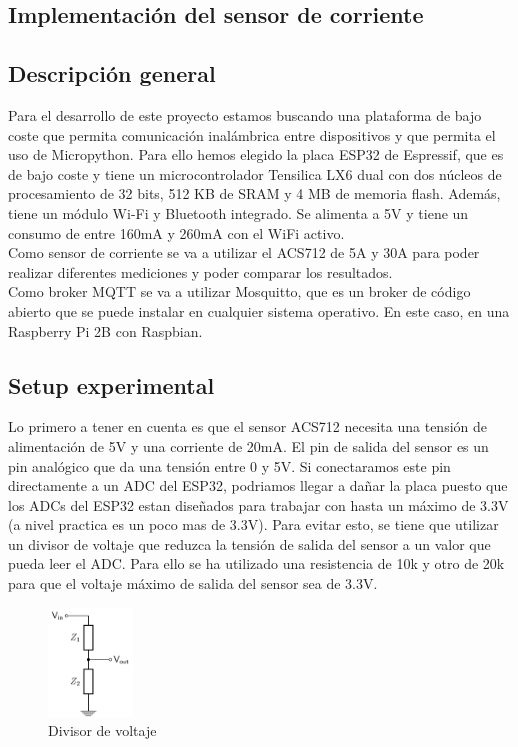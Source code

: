 \begin{titlepage}

\chapter{Implementación del sensor de corriente}
\section{Descripción general}
Para el desarrollo de este proyecto estamos buscando una plataforma de bajo coste que permita comunicación inalámbrica entre dispositivos y que permita el uso de Micropython. Para ello hemos elegido la placa ESP32 de Espressif, que es de bajo coste y tiene un microcontrolador Tensilica LX6 dual con dos núcleos de procesamiento de 32 bits, 512 KB de SRAM y 4 MB de memoria flash. Además, tiene un módulo Wi-Fi y Bluetooth integrado. Se alimenta a 5V y tiene un consumo\cite{ref16} de entre 160mA y 260mA con el WiFi activo. \\

Como sensor de corriente se va a utilizar el ACS712 de 5A y 30A para poder realizar diferentes mediciones y poder comparar los resultados. \\

Como broker MQTT se va a utilizar Mosquitto, que es un broker de código abierto que se puede instalar en cualquier sistema operativo. En este caso, en una Raspberry Pi 2B con Raspbian.\\


\section{Setup experimental}
Lo primero a tener en cuenta es que el sensor ACS712 necesita una tensión de alimentación de 5V y una corriente de 20mA. El pin de salida del sensor es un pin analógico que da una tensión entre 0 y 5V. Si conectaramos este pin directamente a un ADC del ESP32, podriamos llegar a dañar la placa puesto que los ADCs del ESP32 estan diseñados para trabajar con hasta un máximo de 3.3V (a nivel practica es un poco mas de 3.3V). Para evitar esto, se tiene que utilizar un divisor de voltaje que reduzca la tensión de salida del sensor a un valor que pueda leer el ADC. Para ello se ha utilizado una resistencia de 10k y otro de 20k para que el voltaje máximo de salida del sensor sea de 3.3V.\\
\begin{figure}[h!]
	\centering
	\includegraphics[width=0.20\textwidth]{imagenes/voltage_divider.png}
	\caption{Divisor de voltaje\cite{voltage_divider_img}}
\end{figure}


\end{titlepage}

